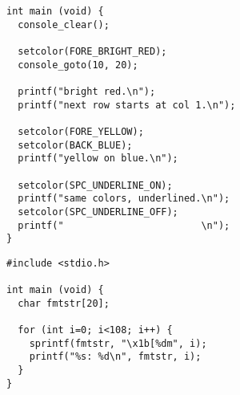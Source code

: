 \begin{frame}[fragile]
%
%
\begin{codebox}[... Fortsetzung]
\begin{verbatim}
int main (void) {
  console_clear();

  setcolor(FORE_BRIGHT_RED);	
  console_goto(10, 20);

  printf("bright red.\n");
  printf("next row starts at col 1.\n");

  setcolor(FORE_YELLOW); 
  setcolor(BACK_BLUE);
  printf("yellow on blue.\n");

  setcolor(SPC_UNDERLINE_ON);
  printf("same colors, underlined.\n");
  setcolor(SPC_UNDERLINE_OFF);
  printf("                        \n");
}
\end{verbatim}
\end{codebox}
%	
\begin{codebox}
\begin{verbatim}
#include <stdio.h>

int main (void) {
  char fmtstr[20];
  
  for (int i=0; i<108; i++) {
    sprintf(fmtstr, "\x1b[%dm", i);
    printf("%s: %d\n", fmtstr, i);
  }
}
\end{verbatim}
\end{codebox}
%
\end{frame}